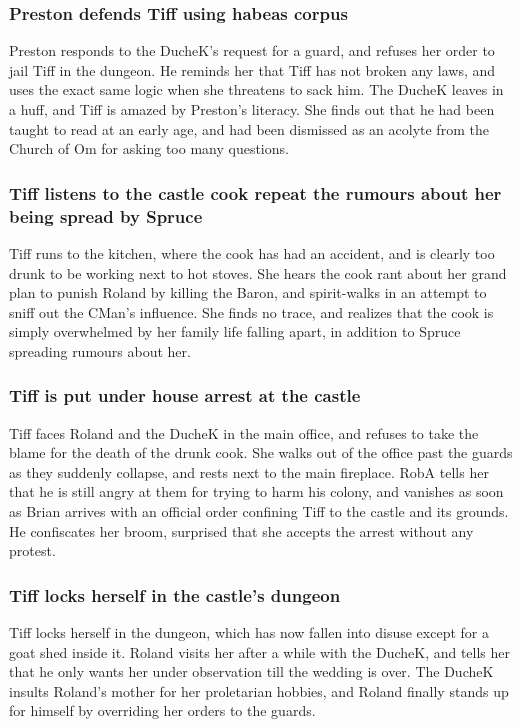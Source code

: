\subsubsection{\Gls{Preston} defends \Gls{Tiff} using habeas corpus}
\Gls{Preston} responds to the \Gls{DucheK}'s request for a guard, and refuses her order to jail
\Gls{Tiff} in the dungeon. He reminds her that \Gls{Tiff} has not broken any laws, and uses the
exact same logic when she threatens to sack him. The \Gls{DucheK} leaves in a huff, and \Gls{Tiff}
is amazed by \Gls{Preston}'s literacy. She finds out that he had been taught to read at an early
age, and had been dismissed as an acolyte from the Church of Om for asking too many questions.

\subsubsection{\Gls{Tiff} listens to the castle cook repeat the rumours about her being spread by
    \Gls{Spruce}}
\Gls{Tiff} runs to the kitchen, where the cook has had an accident, and is clearly too drunk to be
working next to hot stoves. She hears the cook rant about her grand plan to punish \Gls{Roland} by
killing the \Gls{Baron}, and spirit-walks in an attempt to sniff out the \Gls{CMan}'s influence.
She finds no trace, and realizes that the cook is simply overwhelmed by her family life falling
apart, in addition to \Gls{Spruce} spreading rumours about her.

\subsubsection{\Gls{Tiff} is put under house arrest at the castle}
\Gls{Tiff} faces \Gls{Roland} and the \Gls{DucheK} in the main office, and refuses to take the
blame for the death of the drunk cook. She walks out of the office past the guards as they
suddenly collapse, and rests next to the main fireplace. \Gls{RobA} tells her that he is still angry
at them for trying to harm his colony, and vanishes as soon as \Gls{Brian} arrives with an official
order confining \Gls{Tiff} to the castle and its grounds. He confiscates her broom, surprised that
she accepts the arrest without any protest.

\subsubsection{\Gls{Tiff} locks herself in the castle's dungeon}
\Gls{Tiff} locks herself in the dungeon, which has now fallen into disuse except for a goat shed
inside it. \Gls{Roland} visits her after a while with the \Gls{DucheK}, and tells her that he only
wants her under observation till the wedding is over. The \Gls{DucheK} insults \Gls{Roland}'s
mother for her proletarian hobbies, and \Gls{Roland} finally stands up for himself by overriding
her orders to the guards.

